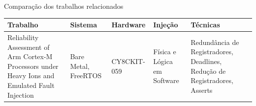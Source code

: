 \begin{quadro}[H]
    \centering
    \caption{Comparação dos trabalhos relacionados}
    \begin{tabular}{|p{}|p{}|p{}|p{}|p{}|}
        \hline
        \rowcolor[HTML]{C0C0C0}
        \textbf{Trabalho} & \textbf{Sistema} & \textbf{Hardware} & \textbf{Injeção} & \textbf{Técnicas} \\
        \hline

        Reliability Assessment of Arm Cortex-M Processors under Heavy Ions and Emulated Fault Injection & Bare Metal, FreeRTOS & CY8CKIT-059 & Física e Lógica em Software & Redundância de Registradores, Deadlines, Redução de Registradores, Asserts \\
        \hline

    \end{tabular}
    \label{tab:trabRel}
\end{quadro}
        
        
        
